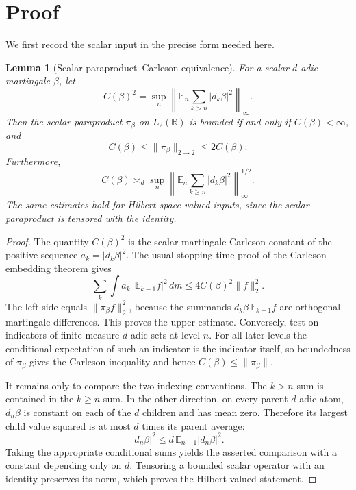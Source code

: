 \documentclass[11pt]{article}
\newtheorem{lemma}[theorem]{Lemma}
\newcommand{\E}{\mathbb E}
\begin{document}
\section{Proof}

We first record the scalar input in the precise form needed here.

\begin{lemma}[Scalar paraproduct--Carleson equivalence]\label{lem:scalar}
For a scalar $d$-adic martingale $\beta$, let
\[
 C(\beta)^2=\sup_n\left\|\E_n\sum_{k>n}|d_k\beta|^2
                    \right\|_\infty.
\]
Then the scalar paraproduct $\pi_\beta$ on $L_2(\mathbb R)$ is bounded if
and only if $C(\beta)<\infty$, and
\[
 C(\beta)\le \|\pi_\beta\|_{2\to2}\le 2C(\beta).
\]
Furthermore,
\[
 C(\beta)\asymp_d
 \sup_n\left\|\E_n\sum_{k\ge n}|d_k\beta|^2\right\|_\infty^{1/2}.
\]
The same estimates hold for Hilbert-space-valued inputs, since the scalar
paraproduct is tensored with the identity.
\end{lemma}

\begin{proof}
The quantity $C(\beta)^2$ is the scalar martingale Carleson constant of the
positive sequence $a_k=|d_k\beta|^2$.  The usual stopping-time proof of the
Carleson embedding theorem gives
\[
 \sum_k\int a_k\,|\E_{k-1}f|^2\,dm
 \le 4C(\beta)^2\|f\|_2^2.
\]
The left side equals $\|\pi_\beta f\|_2^2$, because the summands
$d_k\beta\,\E_{k-1}f$ are orthogonal martingale differences.  This proves the
upper estimate.  Conversely, test on indicators of finite-measure
$d$-adic sets at level $n$.  For all later levels the conditional expectation
of such an indicator is the indicator itself, so boundedness of $\pi_\beta$
gives the Carleson inequality and hence
$C(\beta)\le\|\pi_\beta\|$.

It remains only to compare the two indexing conventions.  The $k>n$ sum is
contained in the $k\ge n$ sum.  In the other direction, on every parent
$d$-adic atom, $d_n\beta$ is constant on each of the $d$ children and has mean
zero.  Therefore its largest child value squared is at most $d$ times its
parent average:
\[
 |d_n\beta|^2\le d\,\E_{n-1}|d_n\beta|^2.
\]
Taking the appropriate conditional sums yields the asserted comparison with
a constant depending only on $d$.  Tensoring a bounded scalar operator with
an identity preserves its norm, which proves the Hilbert-valued statement.
\end{proof}
\end{document}
